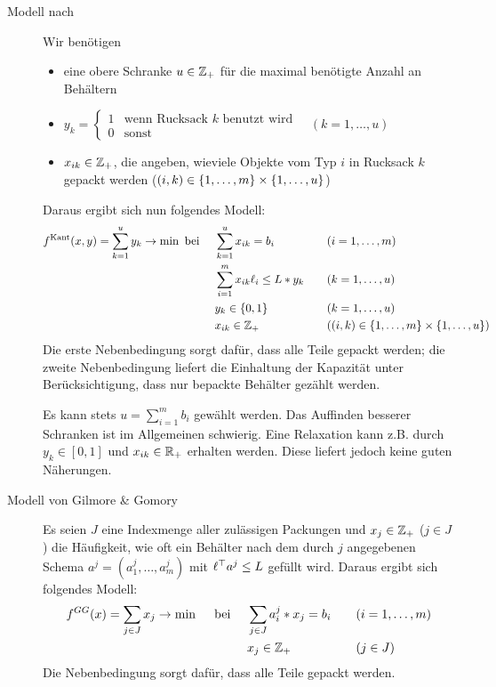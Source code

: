 \begin{description}
	\item[Modell nach ] Wir benötigen 
	\begin{itemize}[nolistsep]
		\item eine obere Schranke $u \in \mathbb{Z}_+$ für die maximal benötigte Anzahl an Behältern
		\item $y_k = \begin{cases}
		1 & \text{wenn Rucksack } k \text{ benutzt wird} \\ 0 & \text{sonst}
		\end{cases} \quad (k = 1 , \dots , u)$
		\item $x_{ik} \in \mathbb{Z}_+$, die angeben, wieviele Objekte vom Typ $i$ in Rucksack $k$ gepackt werden ($(i,k) \in \left\{ 1, \dots , m \right\} \times \left\{ 1, \dots , u \right\}$)
	\end{itemize}
	Daraus ergibt sich nun folgendes Modell:
	\begin{equation*}
		\begin{aligned}
		f^\text{Kant}(x,y) = \sum_{k=1}^u y_k \to \min \text{ bei } \quad & \sum_{k=1}^u x_{ik} = b_i \quad &&(i = 1, \dots , m) \\
		& \sum_{i=1}^m x_{ik} \ell_i \le L * y_k \quad &&(k = 1 , \dots , u) \\
		& y_k \in \left\{ 0,1 \right\} \quad &&(k = 1 , \dots , u) \\
		& x_{ik} \in \mathbb{Z}_+ \quad &&((i,k) \in \left\{ 1, \dots , m \right\} \times \left\{ 1, \dots , u \right\})
		\end{aligned}
	\end{equation*}
	Die erste Nebenbedingung sorgt dafür, dass alle Teile gepackt werden; die zweite Nebenbedingung liefert die Einhaltung der Kapazität unter Berücksichtigung, dass nur bepackte Behälter gezählt werden.

	Es kann stets $u = \sum_{i=1}^m b_i$ gewählt werden. Das Auffinden besserer Schranken ist im Allgemeinen schwierig.
	Eine Relaxation kann z.B. durch $y_k \in [0,1]$ und $x_{ik} \in \mathbb{R}_+$ erhalten werden. Diese liefert jedoch keine guten Näherungen.
	\item[Modell von Gilmore \& Gomory] Es seien $J$ eine Indexmenge aller zulässigen Packungen und $x_j \in \mathbb{Z}_+$ ($j \in J$) die Häufigkeit, wie oft ein Behälter nach dem durch $j$ angegebenen Schema $a^j = (a_1^j , \dots , a_m^j)$ mit $\ell^{\top} a^j \le L$ gefüllt wird.
	Daraus ergibt sich folgendes Modell:
	\begin{equation*}
		\begin{aligned}
		f^{GG}(x) = \sum_{j \in J} x_j \to \min \quad \text{ bei } \quad 
		& \sum_{j \in J} a_i^j * x_j = b_i \quad && (i = 1, \dots , m) \\
		& x_j \in \mathbb{Z}_+ && (j \in J)
		\end{aligned}
	\end{equation*}
	Die Nebenbedingung sorgt dafür, dass alle Teile gepackt werden.
	

\end{description}
